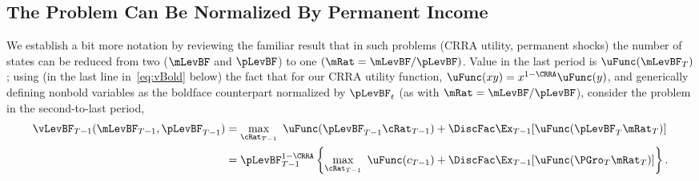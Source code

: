 \documentclass[BufferStockTheory]{subfiles}
\begin{document}
\hypertarget{The-Problem-Can-Be-Rewritten-in-Ratio-Form}{}
\hypertarget{The-Problem-Can-Be-Normalized-By-Permanent-Income}{}
\subsection{The Problem Can Be Normalized By Permanent Income}\label{subsec:ratio}

We establish a bit more notation by reviewing the familiar result that in such problems (CRRA utility, permanent shocks) the number of states can be reduced from two ($\mLevBF$ and $\pLevBF$) to one $(\mRat = \mLevBF/\pLevBF)$.  Value in the last period is $\uFunc(\mLevBF_{T})$; using (in the last line in~\eqref{eq:vBold} below) the fact that for our CRRA utility function, $\uFunc(xy) = x^{1-\CRRA}\uFunc(y)$, and generically defining nonbold variables as the boldface counterpart normalized by $\pLevBF_{t}$ (as with $\mRat=\mLevBF/\pLevBF$), consider the problem in the second-to-last period,
\begin{equation}\label{eq:vBold}
  \begin{split}
    \vLevBF_{T-1}(\mLevBF_{T-1},\pLevBF_{T-1})  
    & =  \max_{\cRat_{T-1}}~
    \uFunc(\pLevBF_{T-1}\cRat_{T-1}) + \DiscFac  \Ex_{T-1} [\uFunc(\pLevBF_{T}{\mRat}
    _{T})]  \\
    & = \pLevBF_{T-1}^{1-\CRRA}
    \left\{\max_{\cRat_{T-1}}~ \uFunc(c_{T-1}) + \DiscFac \Ex_{T-1} [ \uFunc( {\PGro}_{T}
      {\mRat}_{T}) ] \right\}.   
  \end{split}
\end{equation}

\hypertarget{The-Related-Problem}{}
\end{document}
